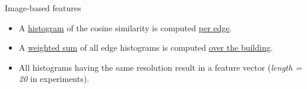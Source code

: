 \documentclass[10pt, export]{beamer}
\begin{document}
            \begin{frame}{Image-based features}
                \begin{figure}
                    \begin{center}
                        
                    \end{center}
                \end{figure}
                \begin{itemize}[label=$\blacktriangleright$, font=\color{IGNGreen}]
                    \item<2-> \footnotesize A \underline{histogram} of the cosine similarity is computed \underline{per edge}.
                    \item<3-> \footnotesize A \underline{weighted sum} of all edge histograms is computed \underline{over the building}.
                    \item<4-> \footnotesize All histograms having the same resolution result in a feature vector (\textit{length = 20} in experiments).
                \end{itemize}
            \end{frame}
\end{document}
